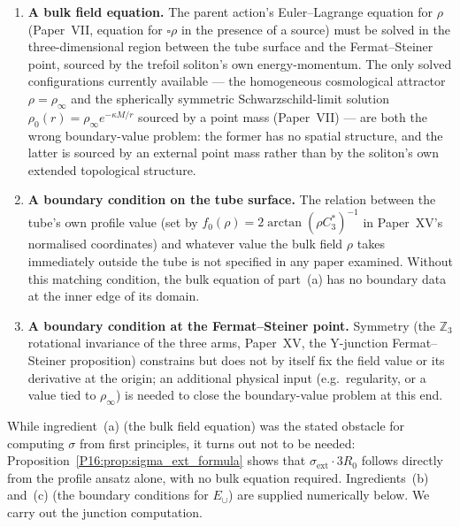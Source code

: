 \documentclass[11pt,a4paper]{article}
\theoremstyle{definition}\newtheorem{definition}[theorem]{Definition}
\theoremstyle{remark}
\theoremstyle{definition}\newtheorem{construction}[theorem]{Construction}
\newcommand{\rinfty}{\rho_{\infty}}
\begin{document}
\begin{enumerate}[label=(\alph*)]
\item \textbf{A bulk field equation.} The parent action's Euler--Lagrange
  equation for $\rho$ (Paper~VII, equation for $\square\rho$ in the
  presence of a source) must be solved in the three-dimensional region
  between the tube surface and the Fermat--Steiner point, sourced by
  the trefoil soliton's own energy-momentum. The only solved
  configurations currently available --- the homogeneous cosmological
  attractor $\rho=\rinfty$ and the spherically symmetric
  Schwarzschild-limit solution $\rho_0(r)=\rinfty e^{-\kappa M/r}$
  sourced by a point mass (Paper~VII) --- are both the wrong boundary-value
  problem: the former has no spatial structure, and the latter is
  sourced by an external point mass rather than by the soliton's own
  extended topological structure.
\item \textbf{A boundary condition on the tube surface.} The relation
  between the tube's own profile value (set by $f_0(\rho)=2\arctan(\rho
  C_3^*)^{-1}$ in Paper~XV's normalised coordinates) and whatever value
  the bulk field $\rho$ takes immediately outside the tube is not
  specified in any paper examined. Without this matching condition,
  the bulk equation of part~(a) has no boundary data at the inner edge
  of its domain.
\item \textbf{A boundary condition at the Fermat--Steiner point.}
  Symmetry (the $\mathbb{Z}_3$ rotational invariance of the three arms,
  Paper~XV, the Y-junction Fermat--Steiner proposition) constrains but does not by itself
  fix the field value or its derivative at the origin; an additional
  physical input (e.g.\ regularity, or a value tied to $\rinfty$) is
  needed to close the boundary-value problem at this end.
\end{enumerate}

While ingredient~(a) (the bulk field equation) was the stated obstacle
for computing $\sigma$ from first principles, it turns out not to be
needed: Proposition~\ref{P16:prop:sigma_ext_formula} shows that
$\sigma_{\mathrm{ext}}\cdot3R_0$ follows directly from the profile
ansatz alone, with no bulk equation required.  Ingredients~(b) and~(c)
(the boundary conditions for $E_\cup$) are supplied numerically below.
We carry out the junction computation.
\end{document}
